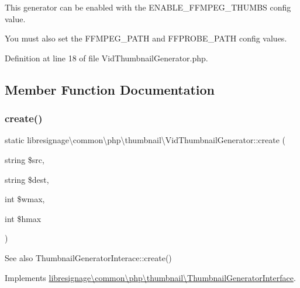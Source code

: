 \begin{DoxyItemize}
\item This generator can be enabled with the E\+N\+A\+B\+L\+E\+\_\+\+F\+F\+M\+P\+E\+G\+\_\+\+T\+H\+U\+M\+BS config value.
\item You must also set the F\+F\+M\+P\+E\+G\+\_\+\+P\+A\+TH and F\+F\+P\+R\+O\+B\+E\+\_\+\+P\+A\+TH config values. 
\end{DoxyItemize}

Definition at line 18 of file Vid\+Thumbnail\+Generator.\+php.



\subsection{Member Function Documentation}
\mbox{\label{classlibresignage_1_1common_1_1php_1_1thumbnail_1_1VidThumbnailGenerator_a175338bc954004ef585a4cafd21bbb98}} 
\subsubsection{\texorpdfstring{create()}{create()}}
{\footnotesize\ttfamily static libresignage\textbackslash{}common\textbackslash{}php\textbackslash{}thumbnail\textbackslash{}\+Vid\+Thumbnail\+Generator\+::create (\begin{DoxyParamCaption}\item[{string}]{\$src,  }\item[{string}]{\$dest,  }\item[{int}]{\$wmax,  }\item[{int}]{\$hmax }\end{DoxyParamCaption})\hspace{0.3cm}{\ttfamily [static]}}

\begin{DoxySeeAlso}{See also}
Thumbnail\+Generator\+Interace\+::create() 
\end{DoxySeeAlso}


Implements \hyperlink{interfacelibresignage_1_1common_1_1php_1_1thumbnail_1_1ThumbnailGeneratorInterface_ac4301d4bc3ac1011243a81a9ad8c68d5}{libresignage\textbackslash{}common\textbackslash{}php\textbackslash{}thumbnail\textbackslash{}\+Thumbnail\+Generator\+Interface}.



